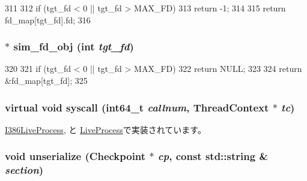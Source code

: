 \begin{DoxyCode}
311 {
312     if (tgt_fd < 0 || tgt_fd > MAX_FD)
313         return -1;
314 
315     return fd_map[tgt_fd].fd;
316 }
\end{DoxyCode}
\hypertarget{classProcess_ac12196dd197c6731a021e211a95edb2d}{
\subsubsection[{sim\_\-fd\_\-obj}]{ $\ast$ sim\_\-fd\_\-obj (int {\em tgt\_\-fd})}}
\label{classProcess_ac12196dd197c6731a021e211a95edb2d}



\begin{DoxyCode}
320 {
321     if (tgt_fd < 0 || tgt_fd > MAX_FD)
322         return NULL;
323 
324     return &fd_map[tgt_fd];
325 }
\end{DoxyCode}
\hypertarget{classProcess_a0abb4f4856f531e5b48484f5114a5bf9}{
\subsubsection[{syscall}]{\setlength{\rightskip}{0pt plus 5cm}virtual void syscall (int64\_\-t {\em callnum}, \/  {\bf ThreadContext} $\ast$ {\em tc})}}
\label{classProcess_a0abb4f4856f531e5b48484f5114a5bf9}


\hyperlink{classX86ISA_1_1I386LiveProcess_a1ed38802271de4269c3adfa46c73e7e7}{I386LiveProcess}, と \hyperlink{classLiveProcess_a1ed38802271de4269c3adfa46c73e7e7}{LiveProcess}で実装されています。\hypertarget{classProcess_af22e5d6d660b97db37003ac61ac4ee49}{
\subsubsection[{unserialize}]{\setlength{\rightskip}{0pt plus 5cm}void unserialize ({\bf Checkpoint} $\ast$ {\em cp}, \/  const std::string \& {\em section})}}
\label{classProcess_af22e5d6d660b97db37003ac61ac4ee49}



